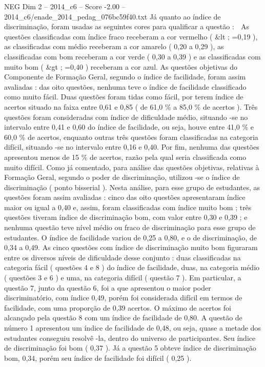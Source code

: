 \begin{textsample}{NEG Dim 2 – 2014\_c6 – Score -2.00 – 2014\_c6/enade\_2014\_pedag\_076bc59f40.txt}
Já quanto ao índice de discriminação, foram usadas as seguintes cores para qualificar a questão :  As questões classificadas com índice fraco receberam a cor vermelho ( \&lt ; =0,19 ), as classificadas com médio receberam a cor amarelo ( 0,20 a 0,29 ), as classificadas com bom receberam a cor verde ( 0,30 a 0,39 ) e as classificadas com muito bom ( \&gt ; =0,40 ) receberam a cor azul.
As questões objetivas do Componente de Formação Geral, segundo o índice de facilidade, foram assim avaliadas : das oito questões, nenhuma teve o índice de facilidade classificado como muito fácil.
Duas questões foram tidas como fácil, por terem índice de acertos situado na faixa entre 0,61 e 0,85 ( de 61,0 \% a 85,0 \% de acertos ).
Três questões foram consideradas com índice de dificuldade médio, situando -se no intervalo entre 0,41 e 0,60 do índice de facilidade, ou seja, houve entre 41,0 \% e 60,0 \% de acertos, enquanto outras três questões foram classificadas na categoria difícil, situando -se no intervalo entre 0,16 e 0,40.
Por fim, nenhuma das questões apresentou menos de 15 \% de acertos, razão pela qual seria classificada como muito difícil.
Como já comentado, para análise das questões objetivas, relativas à Formação Geral, segundo o poder de discriminação, utilizou -se o índice de discriminação ( ponto bisserial ).
Nesta análise, para esse grupo de estudantes, as questões foram assim avaliadas : cinco das oito questões apresentaram índice maior ou igual a 0,40 e, assim, foram classificadas com índice muito bom ; três questões tiveram índice de discriminação bom, com valor entre 0,30 e 0,39 ; e nenhuma questão teve nível médio ou fraco de discriminação para esse grupo de estudantes.
O índice de facilidade variou de 0,25 a 0,80, e o de discriminação, de 0,34 a 0,49.
As cinco questões com índice de discriminação muito bom figuraram entre os diversos níveis de dificuldade desse conjunto : duas classificadas na categoria fácil ( questões 4 e 8 ) do índice de facilidade, duas, na categoria médio ( questões 3 e 6 ) e uma, na categoria difícil ( questão 7 ).
Em particular, a questão 7, junto da questão 6, foi a que apresentou o maior poder discriminatório, com índice 0,49, porém foi considerada difícil em termos de facilidade, com uma proporção de 0,39 acertos.
O máximo de acertos foi alcançado pela questão 8 com um índice de facilidade de 0,80.
A questão de número 1 apresentou um índice de facilidade de 0,48, ou seja, quase a metade dos estudantes conseguiu resolvê -la, dentro do universo de participantes.
Seu índice de discriminação foi bom ( 0,37 ).
Já a questão 5 obteve índice de discriminação bom, 0,34, porém seu índice de facilidade foi difícil ( 0,25 ).

\end{textsample}

